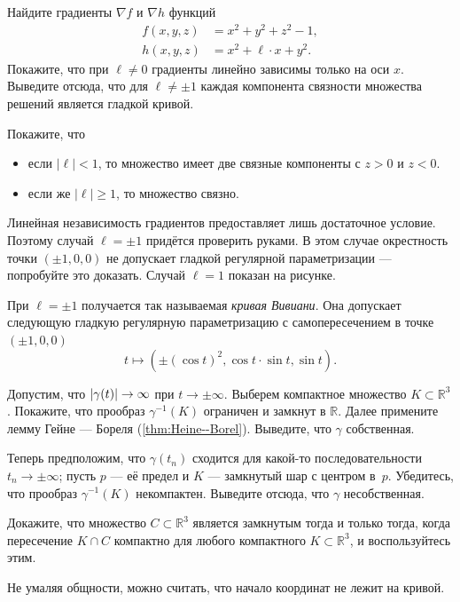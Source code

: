 Найдите градиенты $\nabla f$ и $\nabla h$ функций
\begin{align*}
 f(x,y,z)&=x^2+y^2+z^2-1,
 \\
 h(x,y,z)&=x^2+\ell\cdot x+y^2.
\end{align*}
Покажите, что при $\ell\ne 0$ градиенты линейно зависимы только на оси $x$.
Выведите отсюда, что для $\ell\ne\pm 1$ каждая компонента связности множества решений является гладкой кривой.

Покажите, что 
\begin{itemize}
\item если $|\ell|<1$, то множество имеет две связные компоненты с $z>0$ и $z<0$.
\item если же $|\ell|\ge1$, то множество связно.
\end{itemize}

Линейная независимость градиентов предоставляет лишь достаточное условие.
Поэтому случай $\ell=\pm1$ придётся проверить руками.
В этом случае окрестность точки $(\pm1,0,0)$ не допускает гладкой регулярной параметризации --- попробуйте это доказать.
Случай $\ell=1$ показан на рисунке.



При $\ell=\pm1$ получается так называемая \emph{кривая Вивиани}.
Она допускает следующую гладкую регулярную параметризацию с самопересечением в точке $(\pm1,0,0)$
\[t\mapsto(\pm(\cos t)^2,\cos t\cdot\sin t,\sin t).\]

Допустим, что $|\gamma(t)|\z\to\infty$ при $t\to\pm\infty$.
Выберем компактное множество $K\subset \mathbb{R}^3$.
Покажите, что прообраз $\gamma^{-1}(K)$ ограничен и замкнут в $\mathbb{R}$.
Далее примените лемму Гейне --- Бореля (\ref{thm:Heine--Borel}).
Выведите, что $\gamma$ собственная.

Теперь предположим, что $\gamma(t_n)$ сходится для какой-то последовательности $t_n\to \pm \infty$; пусть $p$ --- её предел и $K$ --- замкнутый шар с центром в~$p$.
Убедитесь, что прообраз $\gamma^{-1}(K)$ некомпактен.
Выведите отсюда, что $\gamma$ несобственная.

Докажите, что множество $C\subset \mathbb{R}^3$ является замкнутым тогда и только тогда, когда пересечение $K\cap C$ компактно для любого компактного $K\subset \mathbb{R}^3$,
и воспользуйтесь этим.

Не умаляя общности, можно считать, что начало координат не лежит на кривой.

